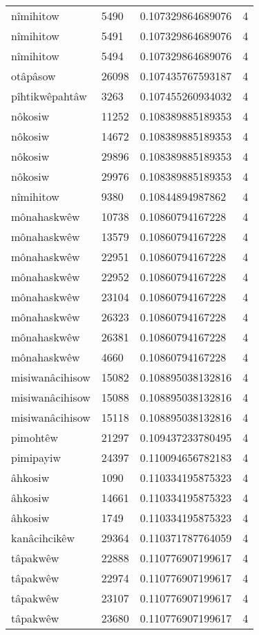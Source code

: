 \begin{longtable}{llll}
nîmihitow & 5490 & 0.107329864689076 & 4 \\
nîmihitow & 5491 & 0.107329864689076 & 4 \\
nîmihitow & 5494 & 0.107329864689076 & 4 \\
otâpâsow & 26098 & 0.107435767593187 & 4 \\
pîhtikwêpahtâw & 3263 & 0.107455260934032 & 4 \\
nôkosiw & 11252 & 0.108389885189353 & 4 \\
nôkosiw & 14672 & 0.108389885189353 & 4 \\
nôkosiw & 29896 & 0.108389885189353 & 4 \\
nôkosiw & 29976 & 0.108389885189353 & 4 \\
nîmihitow & 9380 & 0.10844894987862 & 4 \\
mônahaskwêw & 10738 & 0.10860794167228 & 4 \\
mônahaskwêw & 13579 & 0.10860794167228 & 4 \\
mônahaskwêw & 22951 & 0.10860794167228 & 4 \\
mônahaskwêw & 22952 & 0.10860794167228 & 4 \\
mônahaskwêw & 23104 & 0.10860794167228 & 4 \\
mônahaskwêw & 26323 & 0.10860794167228 & 4 \\
mônahaskwêw & 26381 & 0.10860794167228 & 4 \\
mônahaskwêw & 4660 & 0.10860794167228 & 4 \\
misiwanâcihisow & 15082 & 0.108895038132816 & 4 \\
misiwanâcihisow & 15088 & 0.108895038132816 & 4 \\
misiwanâcihisow & 15118 & 0.108895038132816 & 4 \\
pimohtêw & 21297 & 0.109437233780495 & 4 \\
pimipayiw & 24397 & 0.110094656782183 & 4 \\
âhkosiw & 1090 & 0.110334195875323 & 4 \\
âhkosiw & 14661 & 0.110334195875323 & 4 \\
âhkosiw & 1749 & 0.110334195875323 & 4 \\
kanâcihcikêw & 29364 & 0.110371787764059 & 4 \\
tâpakwêw & 22888 & 0.110776907199617 & 4 \\
tâpakwêw & 22974 & 0.110776907199617 & 4 \\
tâpakwêw & 23107 & 0.110776907199617 & 4 \\
tâpakwêw & 23680 & 0.110776907199617 & 4 \\

\end{longtable}
